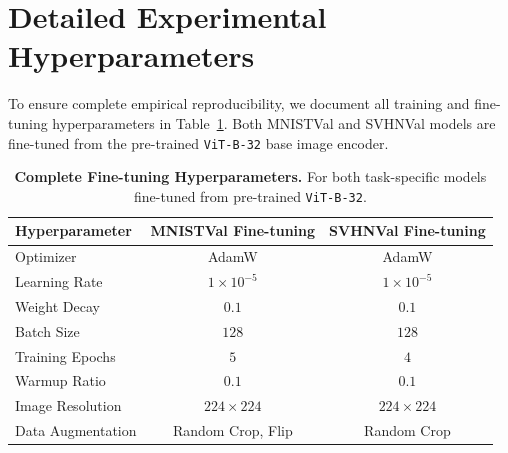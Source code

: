 \documentclass{article}
\theoremstyle{plain}
\theoremstyle{definition}
\theoremstyle{remark}
\begin{document}










\newpage
\appendix
\onecolumn
\section{Detailed Experimental Hyperparameters}
\label{app:hyperparameters}

To ensure complete empirical reproducibility, we document all training and fine-tuning hyperparameters in Table~\ref{tab:hyperparameters}. Both MNISTVal and SVHNVal models are fine-tuned from the pre-trained \texttt{ViT-B-32} base image encoder.

\begin{table}[h]
\caption{\textbf{Complete Fine-tuning Hyperparameters.} For both task-specific models fine-tuned from pre-trained \texttt{ViT-B-32}.}
\label{tab:hyperparameters}
\vskip 0.15in
\begin{center}
\begin{small}
\begin{sc}
\begin{tabular}{lcc}
\toprule
Hyperparameter & MNISTVal Fine-tuning & SVHNVal Fine-tuning \\
\midrule
Optimizer & AdamW & AdamW \\
Learning Rate & $1 \times 10^{-5}$ & $1 \times 10^{-5}$ \\
Weight Decay & $0.1$ & $0.1$ \\
Batch Size & $128$ & $128$ \\
Training Epochs & $5$ & $4$ \\
Warmup Ratio & $0.1$ & $0.1$ \\
Image Resolution & $224 \times 224$ & $224 \times 224$ \\
Data Augmentation & Random Crop, Flip & Random Crop \\
\bottomrule
\end{tabular}
\end{sc}
\end{small}
\end{center}
\end{table}
\end{document}
